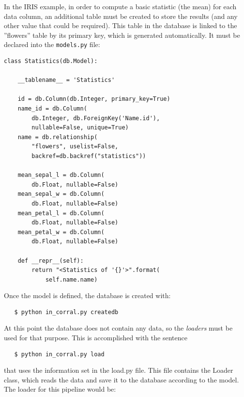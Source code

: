 \documentclass[final,5p,times,twocolumn,authoryear]{elsarticle}
\begin{document}
In the IRIS example, in order to compute a basic statistic (the mean)
for each data column, an additional table must be created to store the
results (and any other value that could be required).
%
This table in the database is linked to the ''flowers'' table by its
primary key, which is generated automatically.
%
It must be declared into the \verb|models.py| file:

\begin{verbatim}
class Statistics(db.Model):

    __tablename__ = 'Statistics'

    id = db.Column(db.Integer, primary_key=True)
    name_id = db.Column(
        db.Integer, db.ForeignKey('Name.id'),
        nullable=False, unique=True)
    name = db.relationship(
        "flowers", uselist=False,
        backref=db.backref("statistics"))

    mean_sepal_l = db.Column(
        db.Float, nullable=False)
    mean_sepal_w = db.Column(
        db.Float, nullable=False)
    mean_petal_l = db.Column(
        db.Float, nullable=False)
    mean_petal_w = db.Column(
        db.Float, nullable=False)

    def __repr__(self):
        return "<Statistics of '{}'>".format(
            self.name.name)
\end{verbatim}


Once the model is defined, the database is created with:

\begin{verbatim}
   $ python in_corral.py createdb
\end{verbatim}

At this point the database does not contain any data, so the
\textit{loaders} must be used for that purpose.
%
This is accomplished with the sentence
%
\begin{verbatim}
   $ python in_corral.py load
\end{verbatim}
%
that uses the information set in the load.py file.
%
This file contains the Loader class, which reads the data and save it
to the database according to the model.
%
The loader for this pipeline would be:
\end{document}
